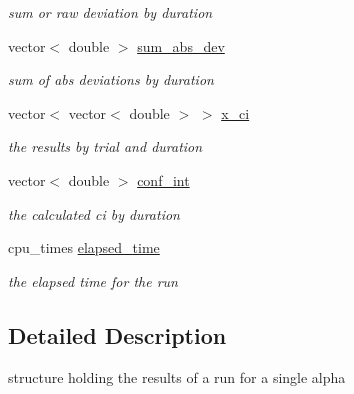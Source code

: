 \begin{DoxyCompactItemize}
\begin{DoxyCompactList}\small\item\em sum or raw deviation by duration \end{DoxyCompactList}\item 
\mbox{\label{structKappaResult_ab68b3871ee5609c7891ca97336e4e5ce}} 
vector$<$ double $>$ \mbox{\hyperlink{structKappaResult_ab68b3871ee5609c7891ca97336e4e5ce}{sum\+\_\+abs\+\_\+dev}}
\begin{DoxyCompactList}\small\item\em sum of abs deviations by duration \end{DoxyCompactList}\item 
\mbox{\label{structKappaResult_a8680d7947e3911486a4b02403bb4de7c}} 
vector$<$ vector$<$ double $>$ $>$ \mbox{\hyperlink{structKappaResult_a8680d7947e3911486a4b02403bb4de7c}{x\+\_\+ci}}
\begin{DoxyCompactList}\small\item\em the results by trial and duration \end{DoxyCompactList}\item 
\mbox{\label{structKappaResult_af0a62f7129da61d2fa8cb5107404a6f4}} 
vector$<$ double $>$ \mbox{\hyperlink{structKappaResult_af0a62f7129da61d2fa8cb5107404a6f4}{conf\+\_\+int}}
\begin{DoxyCompactList}\small\item\em the calculated ci by duration \end{DoxyCompactList}\item 
\mbox{\label{structKappaResult_abe1e9dba96dd6eeaef8e34ad73cd5ba8}} 
cpu\+\_\+times \mbox{\hyperlink{structKappaResult_abe1e9dba96dd6eeaef8e34ad73cd5ba8}{elapsed\+\_\+time}}
\begin{DoxyCompactList}\small\item\em the elapsed time for the run \end{DoxyCompactList}\end{DoxyCompactItemize}


\subsection{Detailed Description}
structure holding the results of a run for a single alpha 

